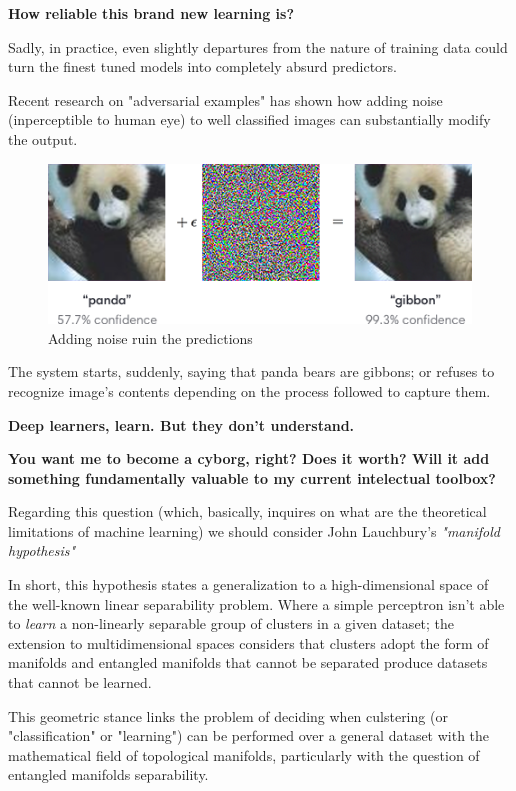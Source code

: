 \textbf{How reliable this brand new learning is?}

Sadly, in practice, even slightly departures from the nature of training data could
turn the finest tuned models into completely absurd predictors.

Recent research on "adversarial examples"\cite{adversarial} has shown how adding 
noise (inperceptible to human eye) to well classified images can substantially modify 
the output.

\begin{figure}[h!]
	\includegraphics[width=\linewidth]{images/panda.png} %
	\caption{Adding noise ruin the predictions} %
	\label{bear} %
\end{figure}

The system starts, suddenly, saying that panda bears are gibbons; \cite{panda} or refuses to 
recognize image's contents depending on the process followed to capture them.

\textbf{Deep learners, learn. But they don't understand.}

\textbf{You want me to become a cyborg, right? Does it worth? Will it add 
something fundamentally valuable to my current intelectual toolbox?}

Regarding this question (which, basically, inquires on what are the theoretical 
limitations of machine learning) we should consider John Lauchbury's \textit{
"manifold hypothesis"} \cite{darpa} 

In short, this hypothesis states a generalization to a high-dimensional space 
of the well-known linear separability problem. Where a simple perceptron isn't 
able to \textit{learn} a non-linearly separable group of clusters in a given 
dataset; the extension to multidimensional spaces considers that clusters adopt 
the form of manifolds and entangled manifolds that cannot be separated produce 
datasets that cannot be learned.

This geometric stance links the problem of deciding when culstering (or 
"classification" or "learning") can be performed over a general dataset with 
the mathematical field of topological manifolds, particularly with the question 
of entangled manifolds separability.\cite{topology}

